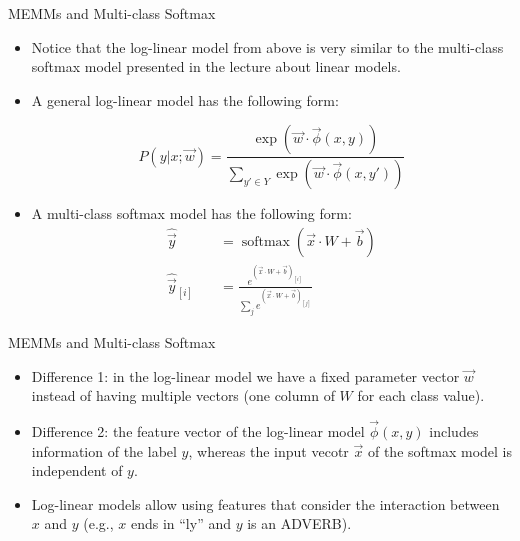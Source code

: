 \documentclass[handout]{beamer}
\begin{document}
\begin{frame}{MEMMs and Multi-class Softmax}
\begin{scriptsize}
\begin{itemize}
\item Notice that the log-linear model from above is very similar to the multi-class softmax model presented in the lecture about linear models.

\item A general log-linear model has the following form:

\begin{displaymath}
 P( y | x; \vec{w}) = \frac{\exp (\vec{w}\cdot \vec{\phi}(x,y))}{\sum_{y' \in Y} \exp (\vec{w}\cdot \vec{\phi}(x,y'))}
\end{displaymath}


\item A multi-class softmax model has the following form:
\begin{equation}
\begin{split}
\hat{\vec{y}} \quad & =  \operatorname{softmax}(\vec{x} \cdot W + \vec{b})  \\
\hat{\vec{y}}_{[i]} \quad & = \frac{e^{(\vec{x} \cdot W + \vec{b})_{[i]}}}{\sum_j e^{(\vec{x} \cdot W + \vec{b})_{[j]}}}
\end{split}
\end{equation}

 
\end{itemize}


\end{scriptsize}
\end{frame}




\begin{frame}{MEMMs and Multi-class Softmax}
\begin{scriptsize}
\begin{itemize}

\item Difference 1: in the log-linear model we have a fixed parameter vector $\vec{w}$ instead of having multiple vectors (one column of $W$ for each class value).

\item Difference 2: the feature vector of the log-linear model $\vec{\phi}(x,y)$ includes information of the label $y$, whereas the input vecotr $\vec{x}$ of the softmax model is independent of $y$. 

\item Log-linear models allow using features that consider the interaction between $x$ and $y$ (e.g., $x$ ends in ``ly'' and $y$ is an ADVERB).

 
\end{itemize}


\end{scriptsize}
\end{frame}
\end{document}
